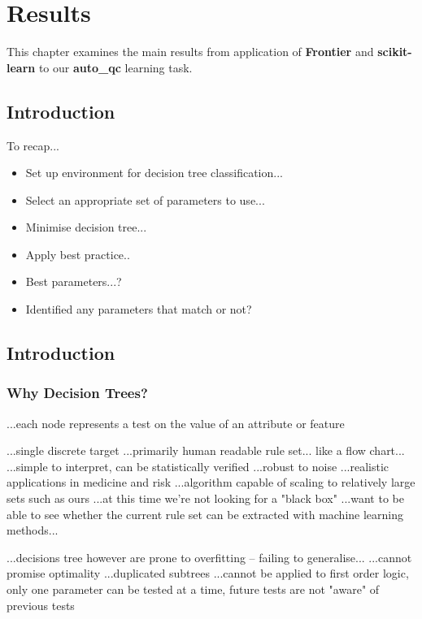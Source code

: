 \chapter{Results}

This chapter examines the main results from application of \textbf{Frontier} and
\textbf{scikit-learn} to our \textbf{auto\_qc} learning task.

\section{Introduction}

To recap...

\begin{itemize}
    \item Set up environment for decision tree classification...
    \item Select an appropriate set of parameters to use...
    \item Minimise decision tree...
    \item Apply best practice..
    \item Best parameters...?
    \item Identified any parameters that match or not?
\end{itemize}

\section{Introduction}
\subsection{Why Decision Trees?}

...each node represents a test on the value of an attribute or feature

...single discrete target
...primarily human readable rule set... like a flow chart...
...simple to interpret, can be statistically verified
...robust to noise
...realistic applications in medicine and risk
...algorithm capable of scaling to relatively large sets such as ours
...at this time we're not looking for a "black box"
...want to be able to see whether the current rule set can be extracted with
machine learning methods...

...decisions tree however are prone to overfitting -- failing to generalise...
...cannot promise optimality
...duplicated subtrees
...cannot be applied to first order logic, only one parameter can be tested at a
time, future tests are not "aware" of previous tests

